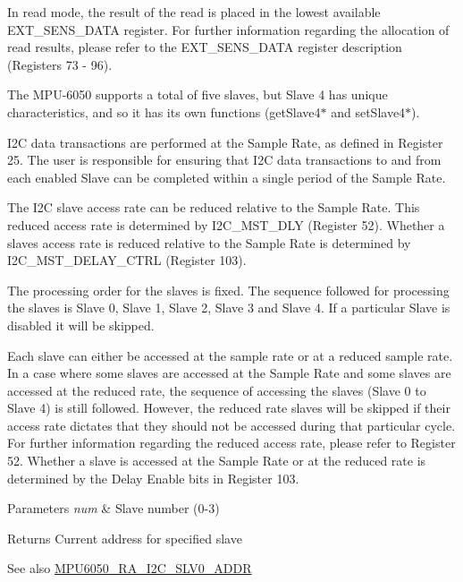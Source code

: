 In read mode, the result of the read is placed in the lowest available E\+X\+T\+\_\+\+S\+E\+N\+S\+\_\+\+D\+A\+TA register. For further information regarding the allocation of read results, please refer to the E\+X\+T\+\_\+\+S\+E\+N\+S\+\_\+\+D\+A\+TA register description (Registers 73 -\/ 96).

The M\+P\+U-\/6050 supports a total of five slaves, but Slave 4 has unique characteristics, and so it has its own functions (get\+Slave4$\ast$ and set\+Slave4$\ast$).

I2C data transactions are performed at the Sample Rate, as defined in Register 25. The user is responsible for ensuring that I2C data transactions to and from each enabled Slave can be completed within a single period of the Sample Rate.

The I2C slave access rate can be reduced relative to the Sample Rate. This reduced access rate is determined by I2\+C\+\_\+\+M\+S\+T\+\_\+\+D\+LY (Register 52). Whether a slave\textquotesingle{}s access rate is reduced relative to the Sample Rate is determined by I2\+C\+\_\+\+M\+S\+T\+\_\+\+D\+E\+L\+A\+Y\+\_\+\+C\+T\+RL (Register 103).

The processing order for the slaves is fixed. The sequence followed for processing the slaves is Slave 0, Slave 1, Slave 2, Slave 3 and Slave 4. If a particular Slave is disabled it will be skipped.

Each slave can either be accessed at the sample rate or at a reduced sample rate. In a case where some slaves are accessed at the Sample Rate and some slaves are accessed at the reduced rate, the sequence of accessing the slaves (Slave 0 to Slave 4) is still followed. However, the reduced rate slaves will be skipped if their access rate dictates that they should not be accessed during that particular cycle. For further information regarding the reduced access rate, please refer to Register 52. Whether a slave is accessed at the Sample Rate or at the reduced rate is determined by the Delay Enable bits in Register 103.


\begin{DoxyParams}{Parameters}
{\em num} & Slave number (0-\/3) \\
\hline
\end{DoxyParams}
\begin{DoxyReturn}{Returns}
Current address for specified slave 
\end{DoxyReturn}
\begin{DoxySeeAlso}{See also}
\hyperlink{MPU6050_8h_a423463fce914683217f05e3ca686364c}{M\+P\+U6050\+\_\+\+R\+A\+\_\+\+I2\+C\+\_\+\+S\+L\+V0\+\_\+\+A\+D\+DR} 
\end{DoxySeeAlso}
